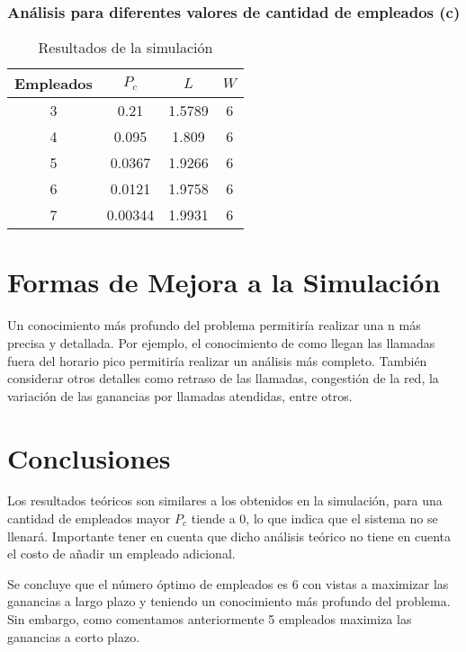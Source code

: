 \documentclass{article}
\begin{document}
\subsubsection*{Análisis para diferentes valores de cantidad de empleados (c)}

\begin{table}[H]
    \centering
    \caption{Resultados de la simulación}
    \begin{tabular}{cccc}
        \toprule
        Empleados & $P_c$ & $L$ & $W$ \\
        \midrule
        3 & 0.21 & 1.5789 & 6 \\
        4 & 0.095 & 1.809 & 6 \\
        5 & 0.0367 & 1.9266 & 6 \\
        6 & 0.0121 & 1.9758 & 6 \\
        7 & 0.00344 & 1.9931 & 6 \\
        \bottomrule
    \end{tabular}
\end{table}

\section{Formas de Mejora a la Simulación}
Un conocimiento más profundo del problema permitiría realizar una n más precisa y detallada. Por ejemplo,
el conocimiento de como llegan las llamadas fuera del horario pico permitiría realizar un análisis más completo.
También considerar otros detalles como retraso de las llamadas, congestión de la red, la variación de las ganancias por llamadas atendidas, entre otros.

\section{Conclusiones}
Los resultados teóricos son similares a los obtenidos en la simulación, para una cantidad de empleados mayor $P_c$ tiende a 0, lo que indica que el sistema no se llenará. 
Importante tener en cuenta que dicho análisis teórico no tiene en cuenta el costo de añadir un empleado adicional.

Se concluye que el número óptimo de empleados es 6 con vistas a maximizar las ganancias a largo plazo y teniendo un conocimiento más profundo del problema. 
Sin embargo, como comentamos anteriormente 5 empleados maximiza las ganancias a corto plazo. 
\end{document}
